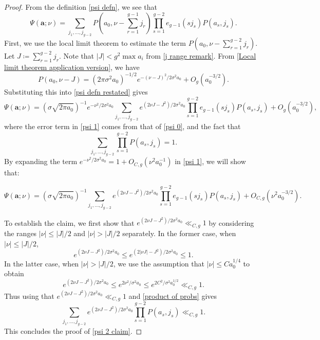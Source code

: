 \documentclass[10pt,a4paper]{amsart}
\newcommand{\ru}[1]{e_{g-1}(#1)}
\renewcommand{\leq}{\leqslant}
\begin{document}
\begin{proof}
From the definition \cref{psi defn}, we see that
\begin{equation}\label{psi defn restated}
    \Psi(\mathbf{a};\nu)=\sum_{j_{1},\ldots, j_{g-2}}P(a_{0},\nu-\sum_{r=1}^{g-1}j_{r})\prod_{s=1}^{g-2}\ru{sj_{s}}P(a_{s},j_{s}).
\end{equation}
    First, we use the local limit theorem to estimate the term $P(a_{0},\nu-\sum_{r=1}^{g-2}j_{r})$. Let $J\coloneqq \sum_{r=1}^{g-2}j_{r}$. Note that $|J|< g^{2}\max a_{i}$ from \cref{j range remark}. From \cref{Local limit theorem application version}, we have 
    \begin{equation}\label{psi 0}
        P(a_{0},\nu-J)=(2\pi\sigma^{2}a_{0})^{-1/2}e^{-(\nu-J)^{2}/2\sigma^{2}a_{0}}+O_{g}(a_{0}^{-3/2}).
    \end{equation}
    Substituting this into \cref{psi defn restated} gives
    \begin{equation}\label{psi 1}
        \Psi(\mathbf{a};\nu)=(\sigma\sqrt{2\pi a_{0}})^{-1}e^{-\nu^{2}/2\sigma^{2}a_{0}}\sum_{j_{1},\ldots, j_{g-2}}e^{(2\nu J-J^{2})/2\sigma^{2}a_{0}}\prod_{s=1}^{g-2}\ru{sj_{s}}P(a_{s},j_{s})+O_{g}(a_{0}^{-3/2}),
    \end{equation}
    where the error term in \cref{psi 1} comes from that of \cref{psi 0}, and the fact that
    \begin{equation}\label{product of probs}
        \sum_{j_{1},\ldots, j_{g-2}}\prod_{s=1}^{g-2}P(a_{s},j_{s})=1.
    \end{equation}
By expanding the term $e^{-\nu^{2}/2\sigma^{2}a_{0}}=1+O_{C,g}(\nu^{2}a_{0}^{-1})$ in \cref{psi 1}, we will show that:
    \begin{claim}\label{psi 2 claim}
        \begin{equation}\label{psi 2 equation}
            \Psi(\mathbf{a};\nu)=(\sigma\sqrt{2\pi a_{0}})^{-1}\sum_{j_{1},\ldots, j_{g-2}}e^{(2\nu J-J^{2})/2\sigma^{2}a_{0}}\prod_{s=1}^{g-2}\ru{sj_{s}}P(a_{s},j_{s})+O_{C,g}(\nu^{2}a_{0}^{-3/2}).
        \end{equation}
    \end{claim} To establish the claim, we first show that $e^{(2\nu J-J^{2})/2\sigma^{2}a_{0}}\ll_{C,g}1$ by considering the ranges $|\nu|\leq |J|/2$ and $|\nu|>|J|/2$ separately. In the former case, when $|\nu|\leq |J|/2$,
    \[e^{(2\nu J-J^{2})/2\sigma^{2}a_{0}}\leq e^{(2|\nu J|-J^{2})/2\sigma^{2}a_{0}}\leq 1.\]
    In the latter case, when $|\nu|>|J|/2$, we use the assumption that $|\nu|\leq Ca_{0}^{1/4}$ to obtain
    \[e^{(2\nu J-J^{2})/2\sigma^{2}a_{0}}\leq e^{2\nu^{2}/\sigma^{2}a_{0}}\leq e^{2C^{2}/\sigma^{2}a_{0}^{1/2}}\ll_{C,g} 1.\]
    Thus using that $e^{(2\nu J-J^{2})/2\sigma^{2}a_{0}}\ll_{C,g}1$ and \cref{product of probs} gives
    \[\sum_{j_{1},\ldots, j_{g-2}}e^{(2\nu J-J^{2})/2\sigma^{2}a_{0}}\prod_{s=1}^{g-2}P(a_{s},j_{s})\ll_{C,g}1.\]
    This concludes the proof of \cref{psi 2 claim}.


\end{proof}
\end{document}

